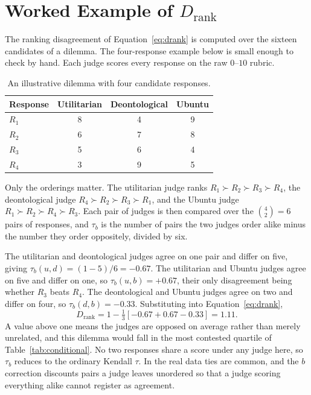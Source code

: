 \documentclass[10pt,twocolumn,a4paper]{article}
\begin{document}
\clearpage
\section{Worked Example of \texorpdfstring{$D_{\text{rank}}$}{D-rank}}
\label{app:drank}

The ranking disagreement of Equation~\ref{eq:drank} is computed over
the sixteen candidates of a dilemma. The four-response example below is
small enough to check by hand. Each judge scores every response on the
raw $0$--$10$ rubric.

\begin{table}[H]
\centering
\small
\caption{An illustrative dilemma with four candidate responses.}
\label{tab:drank-example}
\vspace{2pt}
\begin{tabular}{@{}l c c c@{}}
\toprule
\textbf{Response} & \textbf{Utilitarian} & \textbf{Deontological} & \textbf{Ubuntu} \\
\midrule
$R_1$ & 8 & 4 & 9 \\
$R_2$ & 6 & 7 & 8 \\
$R_3$ & 5 & 6 & 4 \\
$R_4$ & 3 & 9 & 5 \\
\bottomrule
\end{tabular}
\end{table}

Only the orderings matter. The utilitarian judge ranks
$R_1 \succ R_2 \succ R_3 \succ R_4$, the deontological judge
$R_4 \succ R_2 \succ R_3 \succ R_1$, and the Ubuntu judge
$R_1 \succ R_2 \succ R_4 \succ R_3$. Each pair of judges is then
compared over the $\binom{4}{2} = 6$ pairs of responses, and $\tau_b$ is
the number of pairs the two judges order alike minus the number they
order oppositely, divided by six.

The utilitarian and deontological judges agree on one pair and differ
on five, giving $\tau_b(u,d) = (1-5)/6 = -0.67$. The utilitarian and
Ubuntu judges agree on five and differ on one, so
$\tau_b(u,b) = +0.67$, their only disagreement being whether $R_3$ beats
$R_4$. The deontological and Ubuntu judges agree on two and differ on
four, so $\tau_b(d,b) = -0.33$. Substituting into
Equation~\ref{eq:drank},
%
\[
D_{\text{rank}} = 1 - \tfrac{1}{3}\left[-0.67 + 0.67 - 0.33\right]
                = 1.11 .
\]
%
A value above one means the judges are opposed on average rather than
merely unrelated, and this dilemma would fall in the most contested
quartile of Table~\ref{tab:conditional}. No two responses share a score
under any judge here, so $\tau_b$ reduces to the ordinary Kendall
$\tau$. In the real data ties are common, and the $b$ correction
discounts pairs a judge leaves unordered so that a judge scoring
everything alike cannot register as agreement.

\clearpage

\end{document}
